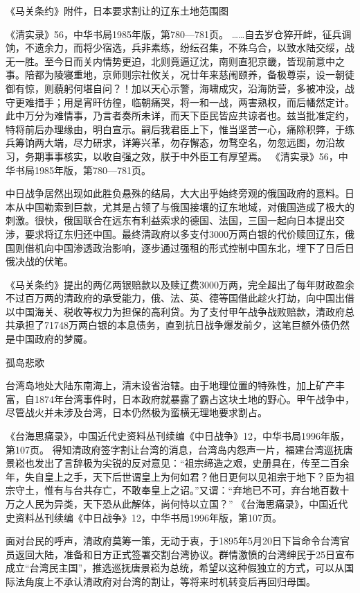 \documentclass[12pt,UTF8]{ctexbook}
\begin{document}
《马关条约》附件，日本要求割让的辽东土地范围图

《清实录》56，中华书局1985年版，第780—781页。
……自去岁仓猝开衅，征兵调饷，不遗余力，而将少宿选，兵非素练，纷纭召集，不殊乌合，以致水陆交绥，战无一胜。至今日而关内情势更迫，北则竟逼辽沈，南则直犯京畿，皆现前意中之事。陪都为陵寝重地，京师则宗社攸关，况廿年来慈闱颐养，备极尊崇，设一朝徒御有惊，则藐躬何堪自问？！加以天心示警，海啸成灾，沿海防营，多被冲没，战守更难措手；用是宵旰彷徨，临朝痛哭，将一和一战，两害熟权，而后幡然定计。此中万分为难情事，乃言者奏所未详，而天下臣民皆应共谅者也。兹当批准定约，特将前后办理缘由，明白宣示。嗣后我君臣上下，惟当坚苦一心，痛除积弊，于练兵筹饷两大端，尽力研求，详筹兴革，勿存懈态，勿骛空名，勿忽远图，勿沿故习，务期事事核实，以收自强之效，朕于中外臣工有厚望焉。 《清实录》56，中华书局1985年版，第780—781页。

中日战争居然出现如此胜负悬殊的结局，大大出乎始终旁观的俄国政府的意料。日本从中国勒索到巨款，尤其是占领了与俄国接壤的辽东地域，对俄国造成了极大的刺激。很快，俄国联合在远东有利益索求的德国、法国，三国一起向日本提出交涉，要求将辽东归还中国。最终清政府以多支付3000万两白银的代价赎回辽东，俄国则借机向中国渗透政治影响，逐步通过强租的形式控制中国东北，埋下了日后日俄决战的伏笔。

《马关条约》提出的两亿两银赔款以及赎辽费3000万两，完全超出了每年财政盈余不过百万两的清政府的承受能力，俄、法、英、德等国借此趁火打劫，向中国出借以中国海关、税收等权力为担保的高利贷。为了支付甲午战争战败赔款，清政府总共承担了71748万两白银的本息债务，直到抗日战争爆发前夕，这笔巨额外债仍然是中国政府的梦魇。

孤岛悲歌

台湾岛地处大陆东南海上，清末设省治辖。由于地理位置的特殊性，加上矿产丰富，自1874年台湾事件时，日本政府就暴露了霸占这块土地的野心。甲午战争中，尽管战火并未涉及台湾，日本仍然极为蛮横无理地要求割占。

《台海思痛录》，中国近代史资料丛刊续编《中日战争》12，中华书局1996年版，第107页。
得知清政府签字割让台湾的消息，台湾岛内怨声一片，福建台湾巡抚唐景崧也发出了言辞极为尖锐的反对意见：“祖宗缔造之艰，史册具在，传至二百余年，失自皇上之手，天下后世谓皇上为何如君？他日更何以见祖宗于地下？臣为祖宗守土，惟有与台共存亡，不敢奉皇上之诏。”又谓：“弃地已不可，弃台地百数十万之人民为异类，天下恐从此解体，尚何恃以立国？” 《台海思痛录》，中国近代史资料丛刊续编《中日战争》12，中华书局1996年版，第107页。

面对台民的呼声，清政府莫筹一策，无动于衷，于1895年5月20日下旨命令台湾官员返回大陆，准备和日方正式签署交割台湾协议。群情激愤的台湾绅民于25日宣布成立“台湾民主国”，推选巡抚唐景崧为总统，希望以这种假独立的方式，可以从国际法角度上不承认清政府对台湾的割让，等将来时机转变后再回归母国。
\end{document}
